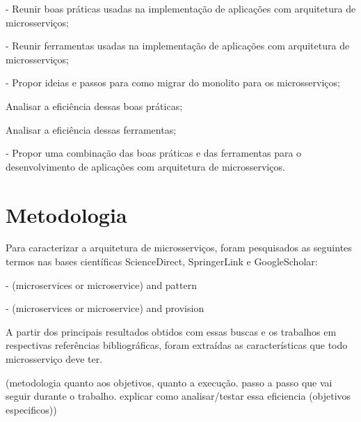 - Reunir boas práticas usadas na implementação de aplicações com arquitetura de microsserviços;

- Reunir ferramentas usadas na implementação de aplicações com arquitetura de microsserviços;

- Propor ideias e passos para como migrar do monolito para os microsserviços;

Analisar a eficiência dessas boas práticas;

Analisar a eficiência dessas ferramentas;

- Propor uma combinação das boas práticas e das ferramentas para o desenvolvimento de aplicações com arquitetura de microsserviços.

\section{Metodologia}

Para caracterizar a arquitetura de microsserviços, foram pesquisados as seguintes termos nas bases científicas ScienceDirect, SpringerLink e GoogleScholar:

- (microservices or microservice) and pattern

- (microservices or microservice) and provision

A partir dos principais resultados obtidos com essas buscas e os trabalhos em respectivas referências bibliográficas, foram extraídas as características que todo microsserviço deve ter.

(metodologia quanto aos objetivos, quanto a execução. passo a passo que vai seguir durante o trabalho. explicar como analisar/testar essa eficiencia (objetivos especificos))